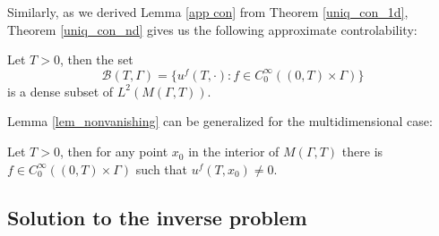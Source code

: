 \documentclass[12pt,oneside,final]{amsart}
\begin{document}
Similarly, as we derived Lemma \ref{app con} from Theorem \ref{uniq_con_1d}, Theorem \ref{uniq_con_nd} gives us the following approximate controlability:

\begin{lemma}\label{app con nd}
	Let $T>0$, then the set 
	\begin{equation*}
		\mathcal{B}(T, \Gamma) = \{u^f(T,\cdot): f\in C_0^\infty((0,T)\times \Gamma)\}
	\end{equation*}
	is a dense subset of $L^2(M(\Gamma,T))$.
\end{lemma}

Lemma \ref{lem_nonvanishing} can be generalized for the multidimensional case:

\begin{lemma}\label{lem_nonvanishing_gen}
	Let $T>0$, then for any point $x_0$ in the interior of $M(\Gamma, T)$ there is $f\in C_0^\infty ((0, T)\times \Gamma)$ such that $u^f(T,x_0)\neq 0$.
\end{lemma}

\subsection{Solution to the inverse problem}
\end{document}

